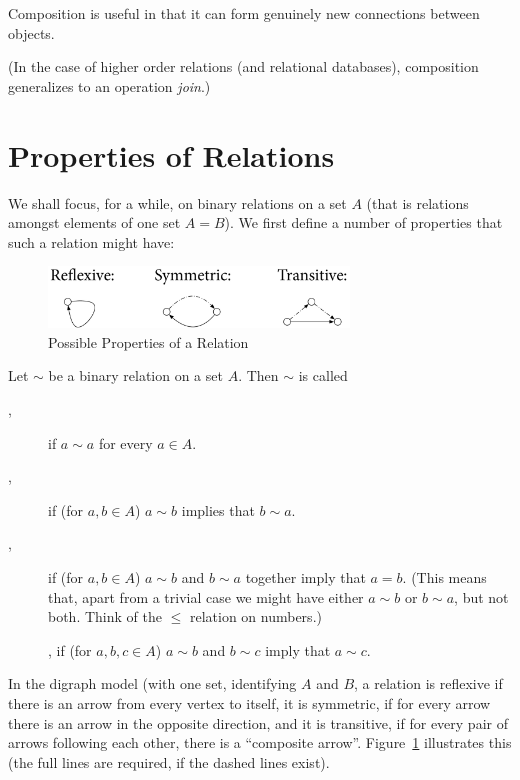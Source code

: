 Composition is useful in that it can form genuinely new connections between
objects. 

(In the case of higher order relations (and relational databases),
composition generalizes to an operation {\em join}.)

\section{Properties of Relations}

We shall focus, for a while, on binary relations on a set $A$ (that is
relations amongst elements of one set $A=B$). We first
define a number of
properties that such a relation might have:
\begin{figure}
\begin{center}
\includegraphics[width=8cm]{pic/RepPropsDigraph}
\end{center}
\caption{Possible Properties of a Relation}
\label{figreppropsdigraph}
\end{figure}
\begin{defn}
Let $\sim$ be a binary relation on a set $A$. Then $\sim$ is called
\begin{description}
\item[,] if $a\sim a$ for every $a\in A$.
\item[,] if (for $a,b\in A$) $a\sim b$ implies that $b\sim a$.
\item[,] if (for $a,b\in A$) $a\sim b$ and $b\sim a$ together
imply that $a=b$. (This means that, apart from a trivial case we might have either
$a\sim b$ or $b\sim a$, but not both. Think of the $\le$ relation on numbers.)
\item[], if (for $a,b,c\in A$) $a\sim b$ and $b\sim c$ imply that
$a\sim c$.
\end{description}
\end{defn}
In the digraph model (with one set, identifying $A$ and $B$, a relation is
reflexive if there is an arrow from every vertex to itself, it is symmetric,
if for every arrow there is an arrow in the opposite direction, and it is
transitive, if for every pair of arrows following each other, there is a
``composite arrow''. Figure~\ref{figreppropsdigraph} illustrates this (the full
lines are required, if the dashed lines exist).

